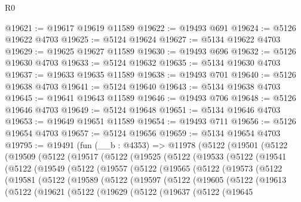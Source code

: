 \begin{lexlean}{R0}
\begin{coremodule}
@19621 := @19617 @19619 @11589
@19622 := @19493 @691
@19624 := @5126 @19622 @4703
@19625 := @5124 @19624
@19627 := @5134 @19622 @4703
@19629 := @19625 @19627 @11589
@19630 := @19493 @696
@19632 := @5126 @19630 @4703
@19633 := @5124 @19632
@19635 := @5134 @19630 @4703
@19637 := @19633 @19635 @11589
@19638 := @19493 @701
@19640 := @5126 @19638 @4703
@19641 := @5124 @19640
@19643 := @5134 @19638 @4703
@19645 := @19641 @19643 @11589
@19646 := @19493 @706
@19648 := @5126 @19646 @4703
@19649 := @5124 @19648
@19651 := @5134 @19646 @4703
@19653 := @19649 @19651 @11589
@19654 := @19493 @711
@19656 := @5126 @19654 @4703
@19657 := @5124 @19656
@19659 := @5134 @19654 @4703
@19795 := @19491
    (fun (__b : @4353) =>
    @11978
      (@5122
        (@19501
          (@5122
            (@19509
              (@5122
                (@19517
                  (@5122
                    (@19525
                      (@5122
                        (@19533
                          (@5122
                            (@19541
                              (@5122
                                (@19549
                                  (@5122
                                    (@19557
                                      (@5122
                                        (@19565
                                          (@5122
                                            (@19573
                                              (@5122
                                                (@19581
                                                  (@5122
                                                    (@19589
                                                      (@5122
                                                        (@19597
                                                          (@5122
                                                            (@19605
                                                              (@5122
                                                                (@19613
                                                                  (@5122
                                                                    (@19621
                                                                      (@5122
                                                                        (@19629
                                                                          (@5122
                                                                            (@19637
                                                                              (@5122
                                                                                (@19645

\end{coremodule}
\end{lexlean}
